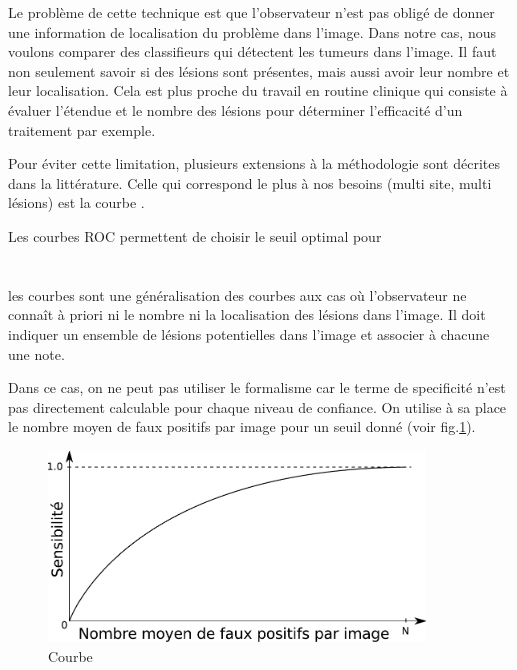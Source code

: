 Le problème de cette technique est que l'observateur n'est pas obligé de donner une information de localisation du problème dans l'image. Dans notre cas, nous voulons comparer des classifieurs qui détectent les tumeurs dans l'image. Il faut non seulement savoir si des lésions sont présentes, mais aussi avoir leur nombre et leur localisation. Cela est plus proche du travail en routine clinique qui consiste à évaluer l'étendue et le nombre des lésions pour déterminer l'efficacité d'un traitement par exemple. 

Pour éviter cette limitation, plusieurs extensions à la méthodologie \ROC sont décrites dans la littérature. Celle qui correspond le plus à nos besoins (multi site, multi lésions) est la courbe \FROC.

Les courbes ROC permettent de choisir le seuil optimal pour 

	\section{\FROC}	

les courbes \FROC sont une généralisation des courbes \ROC aux cas où l'observateur ne connaît à priori ni le nombre ni la localisation des lésions dans l'image. Il doit indiquer un ensemble de lésions potentielles dans l'image et associer à chacune une note.

Dans ce cas, on ne peut pas utiliser le formalisme \ROC car le terme de specificité n'est pas directement calculable pour chaque niveau de confiance. On utilise à sa place le nombre moyen de faux positifs par image pour un seuil donné (voir fig.\ref{fig:courbeFROC}).

\begin{figure}[h]
	
	\label{fig:courbeFROC}
	\begin{center}
	\includegraphics[width=10cm]{images/FROC}
	\end{center}
	\caption{Courbe \FROC}
\end{figure}


